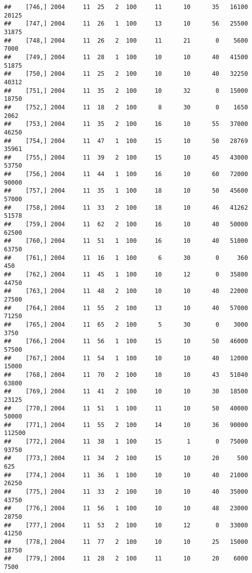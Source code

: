 \documentclass{article}\usepackage[]{graphicx}\usepackage[]{color}
\makeatletter
\newenvironment{kframe}{%
 \def\at@end@of@kframe{}%
 \ifinner\ifhmode%
  \def\at@end@of@kframe{\end{minipage}}%
  \begin{minipage}{\columnwidth}%
 \fi\fi%
 \def\FrameCommand##1{\hskip\@totalleftmargin \hskip-\fboxsep
 \colorbox{shadecolor}{##1}\hskip-\fboxsep
     \hskip-\linewidth \hskip-\@totalleftmargin \hskip\columnwidth}%
 \MakeFramed {\advance\hsize-\width
   \@totalleftmargin\z@ \linewidth\hsize
   \@setminipage}}%
 {\par\unskip\endMakeFramed%
 \at@end@of@kframe}
\newenvironment{knitrout}{}{} %
\makeatother
\begin{document}
\begin{knitrout}
\begin{kframe}
\begin{verbatim}
##    [746,] 2004     11  25   2  100     11      10      35   16100   20125
##    [747,] 2004     11  26   1  100     13      10      56   25500   31875
##    [748,] 2004     11  26   2  100     11      21       0    5600    7000
##    [749,] 2004     11  28   1  100     10      10      40   41500   51875
##    [750,] 2004     11  25   2  100     10      10      40   32250   40312
##    [751,] 2004     11  35   2  100     10      32       0   15000   18750
##    [752,] 2004     11  18   2  100      8      30       0    1650    2062
##    [753,] 2004     11  35   2  100     16      10      55   37000   46250
##    [754,] 2004     11  47   1  100     15      10      50   28769   35961
##    [755,] 2004     11  39   2  100     15      10      45   43000   53750
##    [756,] 2004     11  44   1  100     16      10      60   72000   90000
##    [757,] 2004     11  35   1  100     18      10      50   45600   57000
##    [758,] 2004     11  33   2  100     18      10      46   41262   51578
##    [759,] 2004     11  62   2  100     16      10      40   50000   62500
##    [760,] 2004     11  51   1  100     16      10      40   51000   63750
##    [761,] 2004     11  16   1  100      6      30       0     360     450
##    [762,] 2004     11  45   1  100     10      12       0   35800   44750
##    [763,] 2004     11  48   2  100     10      10      40   22000   27500
##    [764,] 2004     11  55   2  100     13      10      40   57000   71250
##    [765,] 2004     11  65   2  100      5      30       0    3000    3750
##    [766,] 2004     11  56   1  100     15      10      50   46000   57500
##    [767,] 2004     11  54   1  100     10      10      40   12000   15000
##    [768,] 2004     11  70   2  100     10      10      43   51040   63800
##    [769,] 2004     11  41   2  100     10      10      30   18500   23125
##    [770,] 2004     11  51   1  100     11      10      50   40000   50000
##    [771,] 2004     11  55   2  100     14      10      36   90000  112500
##    [772,] 2004     11  38   1  100     15       1       0   75000   93750
##    [773,] 2004     11  34   2  100     15      10      20     500     625
##    [774,] 2004     11  36   1  100     10      10      40   21000   26250
##    [775,] 2004     11  33   2  100     10      10      40   35000   43750
##    [776,] 2004     11  56   1  100     10      10      48   23000   28750
##    [777,] 2004     11  53   2  100     10      12       0   33000   41250
##    [778,] 2004     11  77   2  100     10      10      25   15000   18750
##    [779,] 2004     11  28   2  100     11      10      20    6000    7500

\end{verbatim}
\end{kframe}
\end{knitrout}
\end{document}
